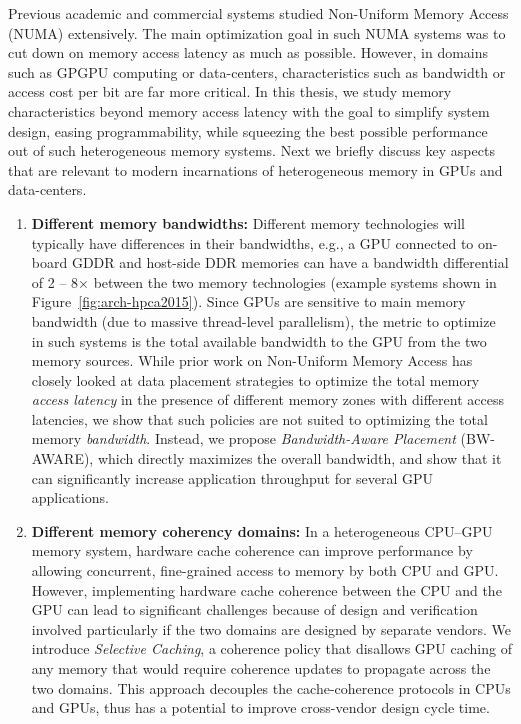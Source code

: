 Previous academic and commercial systems studied Non-Uniform Memory Access (NUMA)
extensively. The main optimization goal in such NUMA systems was to cut
down on memory access latency as much as possible. However, in domains such as
GPGPU computing or data-centers, characteristics
such as bandwidth or access cost per bit are far more critical. In this thesis, we study memory characteristics
beyond memory access latency with the goal to simplify system design, easing
programmability, while squeezing the best possible performance out
of such heterogeneous memory systems.  Next we briefly discuss key aspects that
are relevant to modern incarnations of heterogeneous memory in GPUs and
data-centers.

\begin{enumerate}
\item
\textbf{Different memory bandwidths:}
Different memory technologies will typically have differences in their
bandwidths, e.g., a GPU connected to on-board GDDR and host-side DDR memories
can have a bandwidth differential of 2 -- 8$\times$ between the two
memory technologies (example systems shown in Figure~\ref{fig:arch-hpca2015}).
Since GPUs are sensitive to main memory bandwidth (due to massive thread-level
parallelism), the metric to optimize in such systems is the total available
bandwidth to the GPU from the two memory sources. While prior work on
Non-Uniform Memory Access has closely looked at data placement strategies
to optimize the total memory {\it access latency} in the presence of different
memory zones with different access latencies, we show that such policies are not
suited to optimizing the total memory {\it bandwidth}. Instead, we propose {\it
Bandwidth-Aware Placement} (BW-AWARE), which directly maximizes the overall
bandwidth, and show that it can significantly increase application throughput
for several GPU applications.

\item
\textbf{Different memory coherency domains:} 
In a heterogeneous CPU--GPU memory system, hardware cache coherence can improve
performance by allowing concurrent, fine-grained access to memory by both CPU
and GPU.  However, implementing hardware cache coherence between the CPU and the
GPU can lead to significant challenges because of design and verification
involved particularly if the two domains are designed by separate vendors. We
introduce {\it Selective Caching}, a coherence policy that disallows GPU caching
of any memory that would require coherence updates to propagate across the two
domains. This approach decouples the cache-coherence protocols in CPUs and GPUs,
thus has a potential to improve cross-vendor design cycle time.


\end{enumerate}
